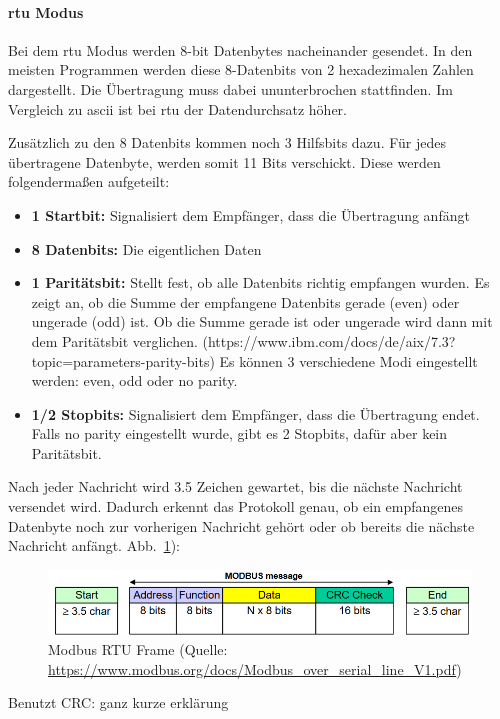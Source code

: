 \paragraph{\acs{rtu} Modus}
Bei dem \acs{rtu} Modus werden 8-bit Datenbytes nacheinander gesendet. In den meisten Programmen werden diese 8-Datenbits von 2 hexadezimalen Zahlen dargestellt. Die Übertragung muss dabei ununterbrochen stattfinden. Im Vergleich zu \acs{ascii} ist bei \acs{rtu} der Datendurchsatz höher. 

Zusätzlich zu den 8 Datenbits kommen noch 3 Hilfsbits dazu. Für jedes übertragene Datenbyte, werden somit 11 Bits verschickt. Diese werden folgendermaßen aufgeteilt:
\begin{itemize}
	\item \textbf{1 Startbit:} Signalisiert dem Empfänger, dass die Übertragung anfängt
	\item \textbf{8 Datenbits:} Die eigentlichen Daten
	\item \textbf{1 Paritätsbit:} Stellt fest, ob alle Datenbits richtig empfangen wurden. Es zeigt an, ob die Summe der empfangene Datenbits gerade (even) oder ungerade (odd) ist. Ob die Summe gerade ist oder ungerade wird dann mit dem Paritätsbit verglichen.   (https://www.ibm.com/docs/de/aix/7.3?topic=parameters-parity-bits) Es können 3 verschiedene Modi eingestellt werden: even, odd oder no parity.
	\item \textbf{1/2 Stopbits:} Signalisiert dem Empfänger, dass die Übertragung endet. Falls no parity eingestellt wurde, gibt es 2 Stopbits, dafür aber kein Paritätsbit.
\end{itemize}

Nach jeder Nachricht wird 3.5 Zeichen gewartet, bis die nächste Nachricht versendet wird. Dadurch erkennt das Protokoll genau, ob ein empfangenes Datenbyte noch zur vorherigen Nachricht gehört oder ob bereits die nächste Nachricht anfängt. 
Abb.~\ref{fig:modbus_frame}):
\begin{figure}[H]
	\centering
	\includegraphics[width=1.0\linewidth]{Bilder/Modbus_frame}
	\caption{Modbus RTU Frame (Quelle: \url{https://www.modbus.org/docs/Modbus_over_serial_line_V1.pdf})}
	\label{fig:modbus_frame}
\end{figure}

Benutzt CRC: ganz kurze erklärung

